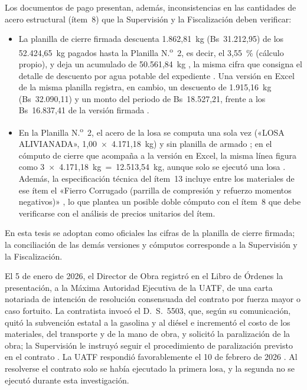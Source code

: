Los documentos de pago presentan, además, inconsistencias en las cantidades de acero estructural (ítem~8) que la Supervisión y la Fiscalización deben verificar:
\begin{itemize}
  \item La planilla de cierre firmada descuenta 1.862,81~kg (Bs~31.212,95) de los 52.424,65~kg pagados hasta la Planilla N.\textsuperscript{o}~2, es decir, el 3,55~\% (cálculo propio), y deja un acumulado de 50.561,84~kg \parencites[p.~16]{uatf2025pao2}[p.~2]{uatf_item13}, la misma cifra que consigna el detalle de descuento por agua potable del expediente \parencite[p.~12]{uatf_item13}. Una versión en Excel de la misma planilla registra, en cambio, un descuento de 1.915,16~kg (Bs~32.090,11) y un monto del periodo de Bs~18.527,21, frente a los Bs~16.837,41 de la versión firmada \parencites{uatf_pao3}[p.~2]{uatf_item13}.
  \item En la Planilla N.\textsuperscript{o}~2, el acero de la losa se computa una sola vez («LOSA ALIVIANADA», 1,00~$\times$~4.171,18~kg) y sin planilla de armado \parencite[p.~20]{uatf2025pao2}; en el cómputo de cierre que acompaña a la versión en Excel, la misma línea figura como 3~$\times$~4.171,18~kg~=~12.513,54~kg, aunque solo se ejecutó una losa \parencite{uatf_pao3}. Además, la especificación técnica del ítem~13 incluye entre los materiales de ese ítem el «Fierro Corrugado (parrilla de compresión y refuerzo momentos negativos)» \parencite[p.~3]{uatf_et}, lo que plantea un posible doble cómputo con el ítem~8 que debe verificarse con el análisis de precios unitarios del ítem.
\end{itemize}

En esta tesis se adoptan como oficiales las cifras de la planilla de cierre firmada; la conciliación de las demás versiones y cómputos corresponde a la Supervisión y la Fiscalización.

El 5 de enero de 2026, el Director de Obra registró en el Libro de Órdenes la presentación, a la Máxima Autoridad Ejecutiva de la UATF, de una carta notariada de intención de resolución consensuada del contrato por fuerza mayor o caso fortuito. La contratista invocó el D.~S.~5503, que, según su comunicación, quitó la subvención estatal a la gasolina y al diésel e incrementó el costo de los materiales, del transporte y de la mano de obra, y solicitó la paralización de la obra; la Supervisión le instruyó seguir el procedimiento de paralización previsto en el contrato \parencite[p.~14]{uatf_item13}. La UATF respondió favorablemente el 10 de febrero de 2026 \parencite[p.~1]{uatf_item13}. Al resolverse el contrato solo se había ejecutado la primera losa, y la segunda no se ejecutó durante esta investigación.

